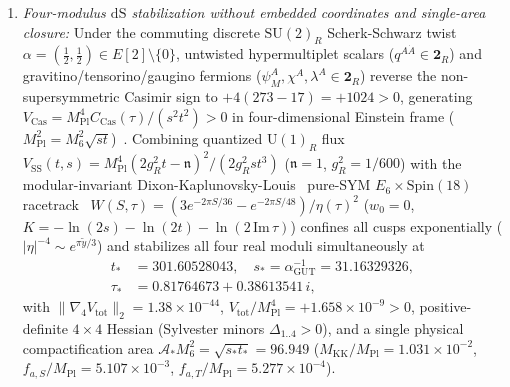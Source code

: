 \documentclass[aps,prd,twocolumn,nofootinbib,floatfix]{revtex4-2}
\begin{document}
\begin{enumerate}
\begin{equation}
    \end{equation}
    \item \emph{Four-modulus $\mathrm{dS}$ stabilization without embedded coordinates and single-area closure:} Under the commuting discrete $\mathrm{SU}(2)_R$ Scherk-Schwarz twist $\alpha = (\frac{1}{2},\frac{1}{2}) \in E[2]\setminus\{0\}$, untwisted hypermultiplet scalars ($q^{A\dot{A}} \in \mathbf{2}_R$) and gravitino/tensorino/gaugino fermions ($\psi_M^A, \chi^A, \lambda^A \in \mathbf{2}_R$) reverse the non-supersymmetric Casimir sign to $+4(273 - 17) = +1024 > 0$, generating $V_{\mathrm{Cas}} = M_{\mathrm{Pl}}^4 C_{\mathrm{Cas}}(\tau)/(s^2 t^2) > 0$ in four-dimensional Einstein frame ($M_{\mathrm{Pl}}^2 = M_6^2\sqrt{st}$)~\cite{BurgessKalloshQuevedo2003}. Combining quantized $\mathrm{U}(1)_R$ flux $V_{\mathrm{SS}}(t,s) = M_{\mathrm{Pl}}^4(2g_R^2 t - \mathfrak{n})^2/(2g_R^2 s t^3)$ ($\mathfrak{n} = 1$, $g_R^2 = 1/600$) with the modular-invariant Dixon-Kaplunovsky-Louis~\cite{FontIbanezLustQuevedo1990,DixonKaplunovskyLouis1991} pure-SYM $E_6\times\mathrm{Spin}(18)$ racetrack~\cite{Krasnikov1987} $W(S,\tau) = (3 e^{-2\pi S/36} - e^{-2\pi S/48})/\eta(\tau)^2$ ($w_0 = 0$, $K = -\ln(2s)-\ln(2t)-\ln(2\,\mathrm{Im}\,\tau)$) confines all cusps exponentially ($|\eta|^{-4} \sim e^{\pi\tilde{y}/3}$) and stabilizes all four real moduli simultaneously at
    \begin{align}
    \label{eq:four_mod_min}
    t_* &= 301.60528043, \quad s_* = \alpha_{\mathrm{GUT}}^{-1} = 31.16329326, \nonumber\\
    \tau_* &= 0.81764673 + 0.38613541\,i,
    \end{align}
    with $\|\nabla_4 V_{\mathrm{tot}}\|_2 = 1.38\times 10^{-44}$, $V_{\mathrm{tot}}/M_{\mathrm{Pl}}^4 = +1.658\times 10^{-9} > 0$, positive-definite $4\times 4$ Hessian (Sylvester minors $\Delta_{1..4} > 0$), and a single physical compactification area $\mathcal{A}_* M_6^2 = \sqrt{s_* t_*} = 96.949$ ($M_{\mathrm{KK}}/M_{\mathrm{Pl}} = 1.031\times 10^{-2}$, $f_{a,S}/M_{\mathrm{Pl}} = 5.107\times 10^{-3}$, $f_{a,T}/M_{\mathrm{Pl}} = 5.277\times 10^{-4}$).

\end{enumerate}
\end{document}
